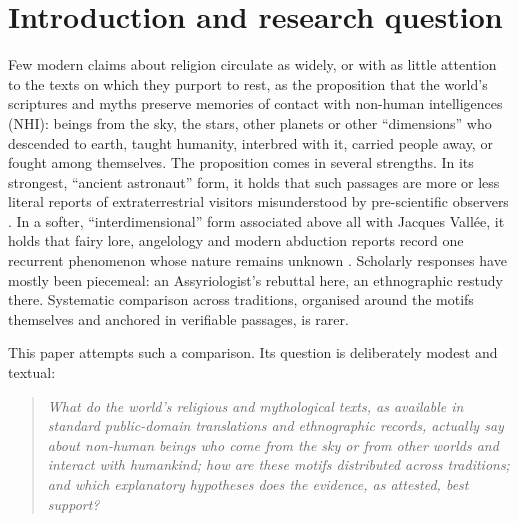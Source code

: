 \documentclass[11pt,a4paper]{article}
\begin{document}
\tableofcontents
\newpage

\section{Introduction and research question}

Few modern claims about religion circulate as widely, or with as little attention to the texts on which they purport to rest, as the proposition that the world's scriptures and myths preserve memories of contact with non-human intelligences (NHI): beings from the sky, the stars, other planets or other ``dimensions'' who descended to earth, taught humanity, interbred with it, carried people away, or fought among themselves. The proposition comes in several strengths. In its strongest, ``ancient astronaut'' form, it holds that such passages are more or less literal reports of extraterrestrial visitors misunderstood by pre-scientific observers \parencite{vondaniken1969chariots,sitchin1976planet,temple1976sirius}. In a softer, ``interdimensional'' form associated above all with Jacques Vallée, it holds that fairy lore, angelology and modern abduction reports record one recurrent phenomenon whose nature remains unknown \parencite{vallee1969,vallee1990}. Scholarly responses have mostly been piecemeal: an Assyriologist's rebuttal here, an ethnographic restudy there. Systematic comparison across traditions, organised around the motifs themselves and anchored in verifiable passages, is rarer.

This paper attempts such a comparison. Its question is deliberately modest and textual:

\begin{quote}
\emph{What do the world's religious and mythological texts, as available in standard public-domain translations and ethnographic records, actually say about non-human beings who come from the sky or from other worlds and interact with humankind; how are these motifs distributed across traditions; and which explanatory hypotheses does the evidence, as attested, best support?}
\end{quote}
\end{document}

